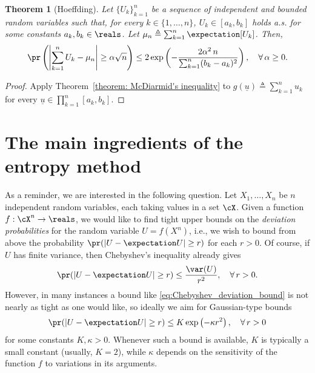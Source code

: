 \documentclass{article}
\theoremstyle{plain}
\newtheorem{theorem}{Theorem}[section]
\begin{document}
\bigskip
\begin{theorem}[Hoeffding]
Let $\{U_k\}_{k=1}^n$ be a sequence of independent and bounded random variables such that,
for every $k \in \{1, \ldots, n\}$, $U_k \in [a_k, b_k]$ holds a.s. for some constants
$a_k, b_k \in \reals$. Let $\mu_n \triangleq \sum_{k=1}^n \expectation[U_k]$.
Then,
\begin{equation}
\pr\left( \left| \sum_{k=1}^n U_k - \mu_n \right| \geq \alpha \sqrt{n} \right)
\leq 2 \exp\left(-\frac{2 \alpha^2 \, n}{\sum_{k=1}^n (b_k-a_k)^2} \right), \quad \forall \, \alpha \geq 0.
\label{eq: Hoeffding inequality}
\end{equation}
\label{theorem: Hoeffding inequality}
\end{theorem}
\begin{proof}
Apply Theorem~\ref{theorem: McDiarmid's inequality} to
$g(\underline{u}) \triangleq \sum_{k=1}^n u_k$ for every $\underline{u} \in \prod_{k=1}^n [a_k, b_k]$.
\end{proof}
\section{The main ingredients of the entropy method}
\label{sec:ingredients}

As a reminder, we are interested in the following question. Let $X_1,\ldots,X_n$ be $n$ independent random variables, each taking values in a set $\cX$. Given a function $f : \cX^n \to \reals$, we would like to find tight upper bounds on the {\em deviation probabilities} for the random variable $U = f(X^n)$, i.e., we wish to bound from above the probability $\pr (|U - \expectation U| \ge r)$ for each $r > 0$. Of course, if $U$ has finite variance, then Chebyshev's inequality already gives
\begin{align}\label{eq:Chebyshev_deviation_bound}
	\pr (|U - \expectation U| \ge r) \le \frac{\var(U)}{r^2}, \quad \forall \, r > 0.
\end{align}
However, in many instances a bound like \eqref{eq:Chebyshev_deviation_bound} is not nearly as tight as one would like, so ideally we aim for Gaussian-type bounds
\begin{align}\label{eq:Gaussian_deviation_bound}
	\pr (|U - \expectation U| \ge r) \le K \exp \left(-\kappa r^2 \right), \quad \forall \, r > 0
\end{align}
for some constants $K, \kappa > 0$. Whenever such a bound is available, $K$ is typically a small constant (usually, $K=2$), while $\kappa$ depends on the sensitivity of the function $f$ to variations in its arguments.
\end{document}
